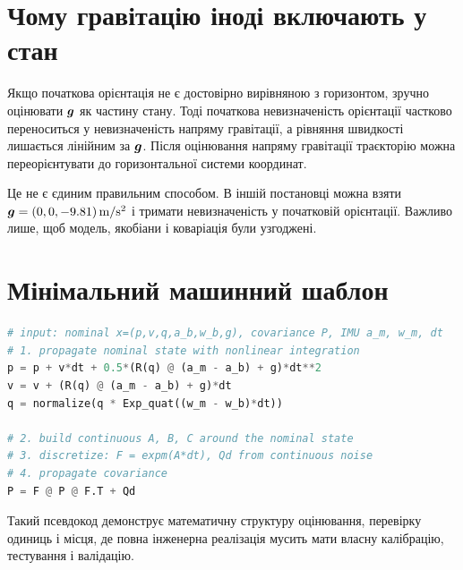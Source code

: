 \section{Чому гравітацію іноді включають у стан}

Якщо початкова орієнтація не є достовірно вирівняною з горизонтом, зручно оцінювати $\bm{g}$ як частину стану. Тоді початкова невизначеність орієнтації частково переноситься у невизначеність напряму гравітації, а рівняння швидкості лишається лінійним за $\bm{g}$. Після оцінювання напряму гравітації траєкторію можна переорієнтувати до горизонтальної системи координат.

Це не є єдиним правильним способом. В іншій постановці можна взяти $\bm{g}=(0,0,-9.81)\,\mathrm{m/s^2}$ і тримати невизначеність у початковій орієнтації. Важливо лише, щоб модель, якобіани і коваріація були узгоджені.

\section{Мінімальний машинний шаблон}

\begin{lstlisting}[language=Python,caption={Псевдокод ESKF-прогнозу. Це не прив'язано до конкретного пакета.}]
# input: nominal x=(p,v,q,a_b,w_b,g), covariance P, IMU a_m, w_m, dt
# 1. propagate nominal state with nonlinear integration
p = p + v*dt + 0.5*(R(q) @ (a_m - a_b) + g)*dt**2
v = v + (R(q) @ (a_m - a_b) + g)*dt
q = normalize(q * Exp_quat((w_m - w_b)*dt))

# 2. build continuous A, B, C around the nominal state
# 3. discretize: F = expm(A*dt), Qd from continuous noise
# 4. propagate covariance
P = F @ P @ F.T + Qd
\end{lstlisting}

Такий псевдокод демонструє математичну структуру оцінювання, перевірку одиниць і місця, де повна інженерна реалізація мусить мати власну калібрацію, тестування і валідацію.
